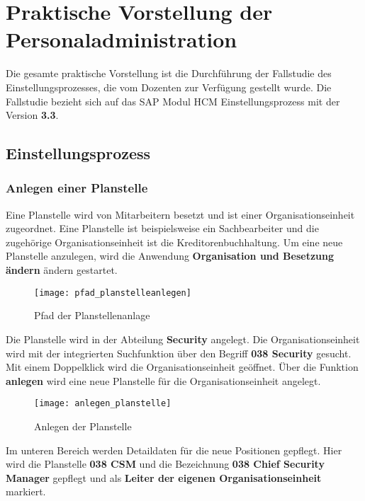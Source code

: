 

\section{Praktische Vorstellung der Personaladministration}
\label{sec:praktischevorstellungderpersonaladministration}

Die gesamte praktische Vorstellung ist die Durchführung der Fallstudie des Einstellungsprozesses, die vom Dozenten zur Verfügung gestellt wurde. Die Fallstudie bezieht sich auf das SAP Modul HCM Einstellungsprozess mit der Version \textbf{3.3}.

\subsection{Einstellungsprozess}
\subsubsection{Anlegen einer Planstelle}
Eine Planstelle wird von Mitarbeitern besetzt und ist einer Organisationseinheit zugeordnet. Eine Planstelle ist beispielsweise ein Sachbearbeiter und die zugehörige Organisationseinheit ist die Kreditorenbuchhaltung. Um eine neue Planstelle anzulegen, wird die Anwendung \textbf{Organisation und Besetzung ändern} ändern gestartet.

\begin{figure}[H]
	\centering
	\texttt{[image: pfad\_planstelleanlegen]}
	\caption{Pfad der Planstellenanlage}
	\label{fig:pfad_planstelleanlegen}
\end{figure}

Die Planstelle wird in der Abteilung \textbf{Security} angelegt. Die Organisationseinheit wird mit der integrierten Suchfunktion über den Begriff \textbf{038 Security} gesucht. Mit einem Doppelklick wird die Organisationseinheit geöffnet. Über die Funktion \textbf{anlegen} wird eine neue Planstelle für die Organisationseinheit angelegt.

\begin{figure}[H]
	\centering
	\texttt{[image: anlegen\_planstelle]}
	\caption{Anlegen der Planstelle}
	\label{fig:anlegen_planstelle}
\end{figure}

Im unteren Bereich werden Detaildaten für die neue Positionen gepflegt. Hier wird die Planstelle \textbf{038 CSM} und die Bezeichnung \textbf{038 Chief Security Manager} gepflegt und als \textbf{Leiter der eigenen Organisationseinheit} markiert.

